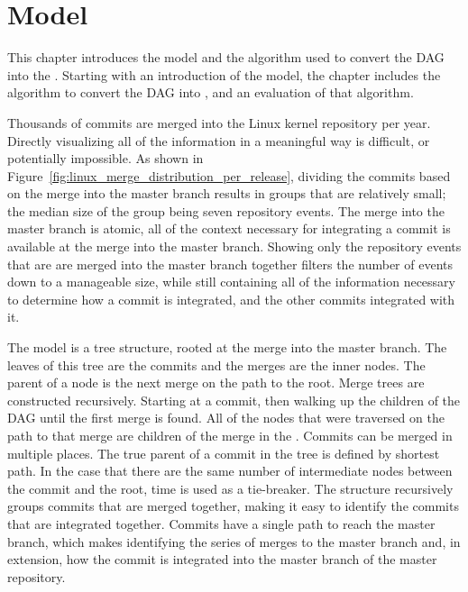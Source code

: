 \chapter{Model}\label{chap:model}

This chapter introduces the \mt{} model and the algorithm used to
convert the DAG into the . Starting with an introduction of the
\mt{} model, the chapter includes the algorithm to convert the DAG into
, and an evaluation of that algorithm.

Thousands of commits are merged into the Linux kernel repository per
year.
Directly visualizing all of the information in a meaningful way is
difficult, or potentially impossible.
As shown in Figure~\ref{fig:linux_merge_distribution_per_release},
dividing the commits based on the merge into the master branch results
in groups that are relatively small;
the median size of the group being seven repository events.
The merge into the master branch is atomic, all of the context necessary
for integrating a commit is available at the merge into the master
branch.
Showing only the repository events that are are merged into the master
branch together filters the number of events down to a manageable size,
while still containing all of the information necessary to determine how
a commit is integrated, and the other commits integrated with it.


The \mt{} model is a tree structure,
rooted at the merge into the master branch.
The leaves of this tree are the commits and the merges are the inner
nodes.
The parent of a node is the next merge on the path to the root.
Merge trees are constructed recursively.
Starting at a commit, then walking up the children of the DAG until the
first merge is found.
All of the nodes that were traversed on the path to that merge are
children of the merge in the \mt{}.
Commits can be merged in multiple places.
The true parent of a commit in the tree is defined by shortest path.
In the case that there are the same number of intermediate nodes
between the commit and the root, time is used as a tie-breaker.
The structure recursively groups commits that are merged together,
making it easy to identify the commits that are integrated together.
Commits have a single path to reach the master branch, which makes
identifying the series of merges to the master branch and, in extension,
how the commit is integrated into the master branch of the master
repository.

